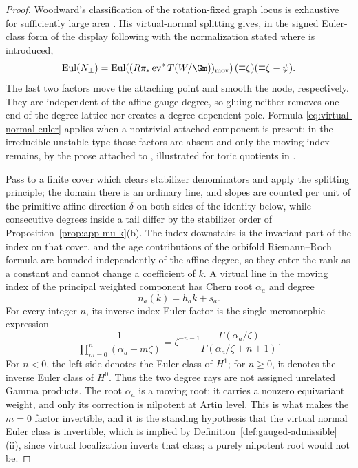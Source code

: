 \begin{proof}
Woodward's classification of the rotation-fixed graph locus is exhaustive
for sufficiently large area \cite[Corollary~9.10]{WoodwardQKIII}.  His
virtual-normal splitting gives, in the signed Euler-class form of the display
following \cite[equation~(59)]{WoodwardQKIII} with the normalization stated
where \cite[equation~(64)]{WoodwardQKIII} is introduced,
\begin{equation}\label{eq:virtual-normal-euler}
 \operatorname{Eul}(N_\pm)=
 \operatorname{Eul}\!\left(
  (R\pi_*\operatorname{ev}^*T(W/\Gm))_{\mathrm{mov}}
 \right)(\mp\zeta)(\mp\zeta-\psi).
\end{equation}
The last two factors move the attaching point and smooth the node,
respectively.  They are
independent of the affine gauge degree, so gluing neither removes one end of
the degree lattice nor creates a degree-dependent pole.  Formula
\eqref{eq:virtual-normal-euler}
applies when a nontrivial attached component is present; in the irreducible
unstable type those factors are absent and only the moving index remains, by
the prose attached to \cite[equation~(59)]{WoodwardQKIII}, illustrated for
toric quotients in \cite[Example~9.15]{WoodwardQKIII}.

Pass to a finite cover which clears stabilizer denominators and apply the
splitting principle; the domain there is an ordinary line, and slopes are
counted per unit of the primitive affine direction \(\delta\) on both sides of
the identity below, while consecutive degrees inside a tail differ by the
stabilizer order of Proposition~\ref{prop:app-mu-k}\textup{(b)}.  The index
downstairs is the invariant part of the index on that cover, and the age
contributions of the orbifold Riemann--Roch formula are bounded independently
of the affine degree, so they enter the rank as a constant and cannot change a
coefficient of \(k\).  A virtual
line in the moving index of the principal
weighted component has Chern root \(\alpha_a\) and degree
\begin{equation}\label{eq:affine-moving-degree}
 n_a(k)=h_ak+s_a.
\end{equation}
For every integer \(n\), its inverse index Euler factor is the single
meromorphic expression
\begin{equation}\label{eq:gamma-index-factor}
 \frac{1}{\prod_{m=0}^{n}(\alpha_a+m\zeta)}
 =\zeta^{-n-1}
   \frac{\Gamma(\alpha_a/\zeta)}
        {\Gamma(\alpha_a/\zeta+n+1)}.
\end{equation}
For \(n<0\), the left side denotes the Euler class of \(H^1\); for
\(n\geq0\), it denotes the inverse Euler class of \(H^0\).  Thus the two
degree rays are not assigned unrelated Gamma products.  The root
\(\alpha_a\) is a moving root: it carries a nonzero equivariant weight, and
only its correction is nilpotent at Artin level.  This is what makes the
\(m=0\) factor invertible, and it is the standing hypothesis that the virtual
normal Euler class is invertible, which is implied by
Definition~\ref{def:gauged-admissible}\textup{(ii)}, since virtual
localization inverts that class; a purely nilpotent root would not be.


\end{proof}
